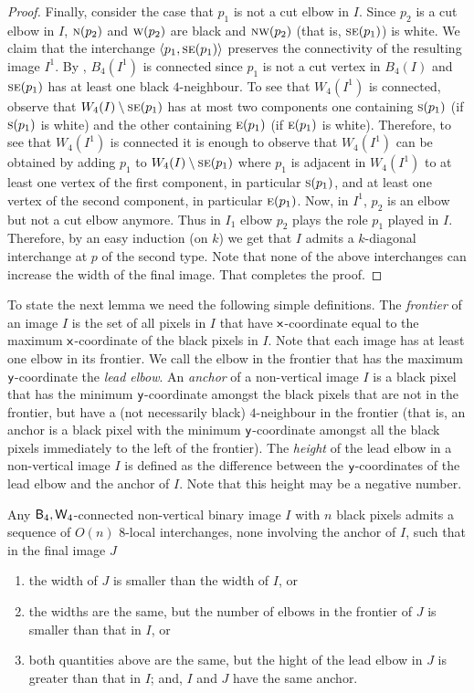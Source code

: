 \documentclass[lotsofwhite,charterfonts]{patmorin}
\newcommand{\fourfour}{\ensuremath{\protect\textup{\textsf{B}}_{4},\protect\textup{\textsf{W}}_{4}}}
\newcommand{\N}{\textsc{n}}
\newcommand{\E}{\textsc{e}}
\newcommand{\SE}{\textsc{se}}
\renewcommand{\S}{\textsc{s}}
\newcommand{\W}{\textsc{w}}
\newcommand{\NW}{\textsc{nw}}
\newcommand{\x}{\ensuremath{\protect\textup{\textsf{x}}}}
\newcommand{\y}{\ensuremath{\protect\textup{\textsf{y}}}}
\newcommand{\ic}[2]{\langle #1,#2 \rangle}
\newcommand{\sm}{\ensuremath{\setminus}}
\begin{document}
\begin{proof}
Finally, consider the case that $p_1$ is not a cut elbow in $I$. Since
$p_2$ is a cut elbow in $I$, $\N(p_2)$ and $\W(p_2)$ are black and
$\NW(p_2)$ (that is, $\SE(p_1)$) is white. We claim that the
interchange $\ic{p_1}{\SE(p_1)}$ preserves the connectivity of the
resulting image $I^1$. By , $B_4(I^1)$ is connected
since $p_1$ is not a cut vertex in $B_4(I)$ and $\SE(p_1)$ has at
least one black $4$-neighbour. To see that $W_4(I^1)$ is connected,
observe that $W_4(I)\sm \SE(p_1)$ has at most two components one
containing $\S(p_1)$ (if $\S(p_1)$ is white) and the other containing
$\E(p_1)$ (if $\E(p_1)$ is white). Therefore, to see that $W_4(I^1)$
is connected it is enough to observe that $W_4(I^1)$ can be obtained
by adding $p_1$ to $W_4(I)\sm \SE(p_1)$ where $p_1$ is adjacent in
$W_4(I^1)$ to at least one vertex of the first component, in
particular $\S(p_1)$, and at least one vertex of the second component,
in particular $\E(p_1)$. Now, in $I^1$, $p_2$ is an elbow but not a
cut elbow anymore. Thus in $I_1$ elbow $p_2$ plays the role $p_1$
played in $I$. Therefore, by an easy induction (on $k$) we get that
$I$ admits a $k$-diagonal interchange at $p$ of the second type. Note
that none of the above interchanges can increase the width of the
final image. That completes the proof.  
\end{proof}

To state the next lemma we need the following simple definitions.  The
\emph{frontier} of an image $I$ is the set of all pixels in $I$ that
have \x-coordinate equal to the maximum \x-coordinate of the black
pixels in $I$. Note that each image has at least one elbow in its
frontier. We call the elbow in the frontier that has the maximum
\y-coordinate the \emph{lead elbow}. An \emph{anchor} of a
non-vertical image $I$ is a black pixel that has the minimum
\y-coordinate amongst the black pixels that are not in the frontier,
but have a (not necessarily black) $4$-neighbour in the frontier (that
is, an anchor is a black pixel with the minimum \y-coordinate amongst all
the black pixels immediately to the left of the frontier). The
\emph{height} of the lead elbow in a non-vertical image $I$ is defined
as the difference between the \y-coordinates of the lead elbow and the
anchor of $I$. Note that this height may be a negative number.


\begin{lem}
Any \fourfour-connected non-vertical binary image $I$ with $n$ black pixels admits a sequence of $O(n)$ 8-local interchanges, none involving the anchor of $I$, such that in the final image $J$

\begin{enumerate}
\item the width of $J$ is smaller than the width of $I$, or 
\item the widths are the same, but the number of elbows in the frontier of $J$ is smaller than that in $I$, or
\item both quantities above are the same, but the hight of the lead elbow in $J$ is greater than that in $I$; and, $I$ and $J$ have the same anchor.
\end{enumerate}
\end{lem}
\end{document}
